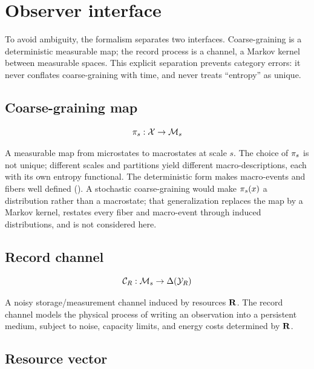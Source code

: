 \section{Observer interface}\label{sec:observer}

To avoid ambiguity, the formalism separates two interfaces.
Coarse-graining is a deterministic measurable map; the record process is
a channel, a Markov kernel between measurable spaces.  This explicit
separation prevents category errors: it never conflates coarse-graining
with time, and never treats ``entropy'' as unique.

\subsection{Coarse-graining map}

\begin{equation}
  \pi_s : \mathcal{X} \to \mathcal{M}_s\label{eq:coarse-graining}
\end{equation}

A measurable map from microstates to macrostates at scale $s$.  The
choice of $\pi_s$ is not unique; different scales and partitions
yield different macro-descriptions, each with its own entropy
functional.  The deterministic form makes macro-events and fibers well
defined ().  A
stochastic coarse-graining would make $\pi_s(x)$ a distribution
rather than a macrostate; that generalization replaces the map by a
Markov kernel, restates every fiber and macro-event through induced
distributions, and is not considered here.

\subsection{Record channel}

\begin{equation}
  \mathcal{C}_R : \mathcal{M}_s \to \Delta(\mathcal{Y}_R)\label{eq:record-channel}
\end{equation}

A noisy storage/measurement channel induced by resources $\mathbf{R}$.  The
record channel models the physical process of writing an observation into a
persistent medium, subject to noise, capacity limits, and energy costs
determined by $\mathbf{R}$.

\subsection{Resource vector}

